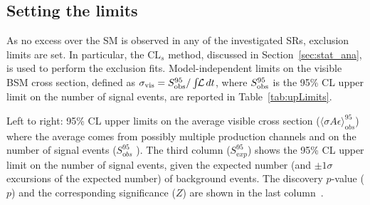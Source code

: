  		\subsection{Setting the limits}
 		\label{subsec:limitset}

			As no excess over the \ac{SM} is observed in any of the investigated \acp{SR}, exclusion limits are set. In particular, the $\mathrm{CL}_s$ method, discussed in Section~\ref{sec:stat_ana}, is used to perform the exclusion fits. Model-independent limits on the visible \ac{BSM} cross section, defined as $\sigma_{\mathrm{vis}} = S^{95}_{\textnormal{obs}}/\int\!\!{\mathcal L}\,dt$, where $S^{95}_{\textnormal{obs}}$ is the 95\% CL upper limit on the number of signal events, are reported in Table~\ref{tab:upLimits}.

			\begin{table}[htpb]
				\caption{Left to right: 95\% CL upper limits on the average visible cross section ($\langle\sigma A \epsilon\rangle_{\mathrm obs}^{95}$) where the average comes from possibly multiple production channels and on the number of signal events ($S_{\mathrm obs}^{95}$ ).  The third column ($S_{\mathrm exp}^{95}$) shows the 95\% CL upper limit on the number of signal events, given the expected number (and $\pm 1\sigma$ excursions of the expected number) of background events. The discovery $p$-value ($p$) and the corresponding significance ($Z$) are shown in the last column~\cite{stop0L}.}
				\label{tab:upLimits}
				\begin{center}
		    	
				\end{center}
			\end{table}

